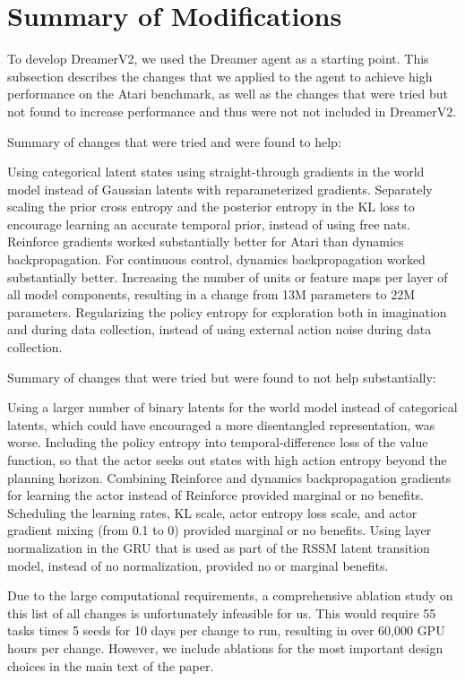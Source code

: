 \section{Summary of Modifications}
\label{sec:modifications}

To develop DreamerV2, we used the Dreamer agent \citep{hafner2019dreamer} as a starting point. This subsection describes the changes that we applied to the agent to achieve high performance on the Atari benchmark, as well as the changes that were tried but not found to increase performance and thus were not not included in DreamerV2.

Summary of changes that were tried and were found to help:

\begin{itemize}
 Using categorical latent states using straight-through gradients in the world model instead of Gaussian latents with reparameterized gradients.
 Separately scaling the prior cross entropy and the posterior entropy in the KL loss to encourage learning an accurate temporal prior, instead of using free nats.
 Reinforce gradients worked substantially better for Atari than dynamics backpropagation. For continuous control, dynamics backpropagation worked substantially better.
 Increasing the number of units or feature maps per layer of all model components, resulting in a change from 13M parameters to 22M parameters.
 Regularizing the policy entropy for exploration both in imagination and during data collection, instead of using external action noise during data collection.
\end{itemize}

Summary of changes that were tried but were found to not help substantially:

\begin{itemize}
 Using a larger number of binary latents for the world model instead of categorical latents, which could have encouraged a more disentangled representation, was worse.
 Including the policy entropy into temporal-difference loss of the value function, so that the actor seeks out states with high action entropy beyond the planning horizon.
 Combining Reinforce and dynamics backpropagation gradients for learning the actor instead of Reinforce provided marginal or no benefits.
 Scheduling the learning rates, KL scale, actor entropy loss scale, and actor gradient mixing (from 0.1 to 0) provided marginal or no benefits.
 Using layer normalization in the GRU that is used as part of the RSSM latent transition model, instead of no normalization, provided no or marginal benefits.
\end{itemize}

Due to the large computational requirements, a comprehensive ablation study on this list of all changes is unfortunately infeasible for us. This would require 55 tasks times 5 seeds for 10 days per change to run, resulting in over 60,000 GPU hours per change. However, we include ablations for the most important design choices in the main text of the paper.
